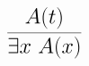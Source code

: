 \documentclass[14pt,border=2pt]{standalone}
\begin{document}
        $$
        \LARGE 

\begin{prooftree}
\hypo{A(t)}
\infer1{\exists x~ A(x)}
\end{prooftree}
        $$
        
\end{document}
